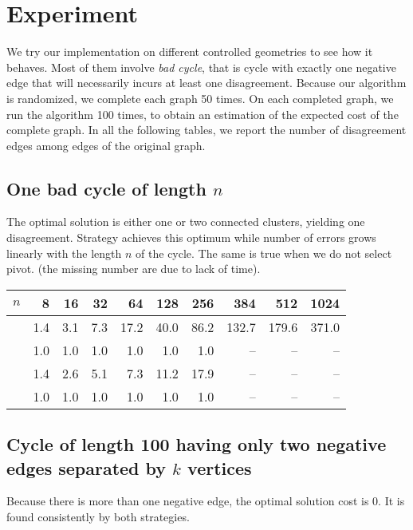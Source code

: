 \section{Experiment}

We try our implementation on different controlled geometries to see how it
behaves. Most of them involve \emph{bad cycle}, that is cycle with exactly one
negative edge that will necessarily incurs at least one disagreement.  Because
our algorithm is randomized, we complete each graph 50 times.  On each
completed graph, we run the \ccp{} algorithm 100 times, to obtain an
estimation of the expected cost of the complete graph. In all the following
tables, we report the number of disagreement edges among edges of the original
graph.

\subsection{One bad cycle of length $n$}
\label{sub:cycle}

The optimal solution is either one or two connected clusters, yielding one
disagreement. Strategy \pat{} achieves this optimum while \pot{} number of
errors grows linearly with the length $n$ of the cycle. The same is true when
we do not select pivot. (the missing number are due to lack of time).

\begin{center}
\begin{tabular}{lrrrrrrrrr}
\toprule
$n$      & 8   & 16  & 32  & 64   & 128  & 256  & 384   & 512   & 1024 \\
\midrule
\pot{}   & 1.4 & 3.1 & 7.3 & 17.2 & 40.0 & 86.2 & 132.7 & 179.6 & 371.0 \\
\pat{}   & 1.0 & 1.0 & 1.0 & 1.0  & 1.0  & 1.0  & --    & --    & -- \\
\nnot{}  & 1.4 & 2.6 & 5.1 & 7.3  & 11.2 & 17.9 & --    & --    & --\\
\nat{}   & 1.0 & 1.0 & 1.0 & 1.0  & 1.0  & 1.0  & --    & --    & --\\
\bottomrule
\end{tabular}
\end{center}



\subsection{Cycle of length 100 having only two negative edges separated by
	$k$ vertices}
Because there is more than one negative edge, the optimal solution cost is 0.
It is found consistently by both strategies.

